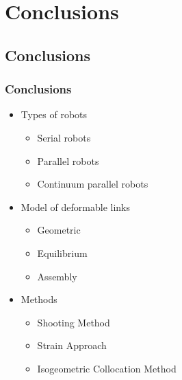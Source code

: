\documentclass[compress]{thesisbeamer}
\begin{document}
  	\section{Conclusions}
      	\subsection{Conclusions}
        \begin{frame}
        	\frametitle{Conclusions}
        	\begin{itemize}
        		\item Types of robots
        		\begin{itemize}
        			\item Serial robots
        			\item Parallel robots
        			\item Continuum parallel robots
        		\end{itemize}
        		\item Model of deformable links
       		 	\begin{itemize}
        			\item Geometric
        			\item Equilibrium
        			\item Assembly
        		\end{itemize}
        		\item Methods
        		\begin{itemize}
        			\item Shooting Method
       		 		\item Strain Approach
       		 		\item Isogeometric Collocation Method
        		\end{itemize}
        	\end{itemize}
        \end{frame}
        	
\end{document}
